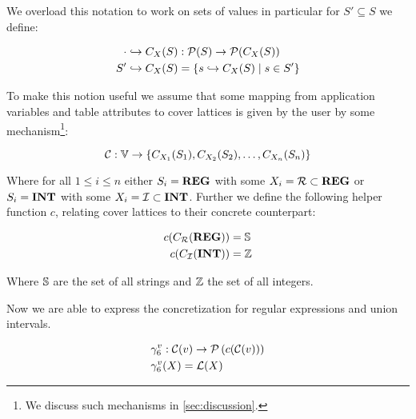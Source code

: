 We overload this notation to work on sets of values in particular for $S' \subseteq S$ we define:

\begin{align}
    \cdot \hookrightarrow C_X(S) &: \mathcal{P}(S) \rightarrow \mathcal{P}(C_X(S)) \\
    S' \hookrightarrow C_X (S) &= \{s \hookrightarrow C_X(S) \mid s \in S'\}
\end{align}

To make this notion useful we assume that some mapping from application variables and table attributes to cover lattices is given by the user by some mechanism\footnote{We discuss such mechanisms in \autoref{sec:discussion}.}:

\begin{equation}\label{eq:lookupcl}
    \lookupcl : \mathbb{V} \rightarrow \{ C_{X_1}(S_1), C_{X_2}(S_2), \dots, C_{X_n}(S_n) \}
\end{equation}


Where for all $1 \leq i \leq n$ either $S_i = \mathbf{REG}$ with some $X_i = \mathcal{R} \subset \mathbf{REG}$ or $S_i = \mathbf{INT}$ with some $X_i = \mathcal{I} \subset \mathbf{INT}$.
Further we define the following helper function $c$, relating cover lattices to their concrete counterpart:


\begin{align}
    c(C_{\mathcal{R}}(\mathbf{REG})) &= \mathbb{S} \\
    c(C_{\mathcal{I}}(\mathbf{INT})) &= \mathbb{Z}
\end{align}


Where $\mathbb{S}$ are the set of all strings and $\mathbb{Z}$ the set of all integers.

Now we are able to express the concretization for regular expressions and union intervals.

\begin{align}
    &\gamma^v_6 : \mathcal{C}(v) \rightarrow \mathcal{P}\left(c(\mathcal{C}(v))\right) \\
    &\gamma^v_6(X) = \mathcal{L}(X)
\end{align}

%

